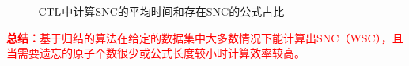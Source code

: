 \documentclass[aspectratio=1610, 9pt, CJK]{beamer}
\begin{document}
\begin{frame}
		\begin{figure}
			\centering
			\qquad
		\caption{{\footnotesize $\textrm{CTL}$中计算SNC的平均时间和存在SNC的公式占比}}
		\end{figure}
\textcolor{red}{\textbf{总结：}基于归结的算法在给定的数据集中大多数情况下能计算出SNC（WSC），且当需要遗忘的原子个数很少或公式长度较小时计算效率较高。}
\end{frame}
\end{document}
